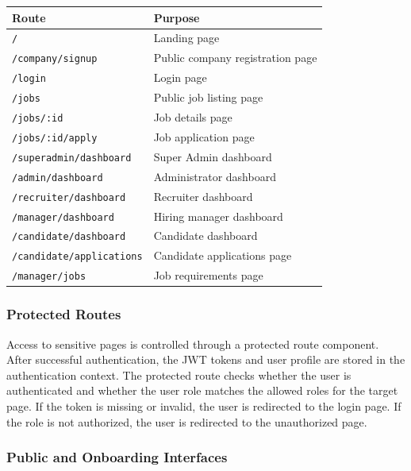 \begin{center}
\label{tab:frontend_routes}
\renewcommand{\arraystretch}{0.8}
\begin{tabularx}{\textwidth}{|l|l|}
\hline
\rowcolor{gray!20} \textbf{Route} & \textbf{Purpose} \\
\hline
\texttt{/} & Landing page \\
\hline
\texttt{/company/signup} & Public company registration page \\
\hline
\texttt{/login} & Login page \\
\hline
\texttt{/jobs} & Public job listing page \\
\hline
\texttt{/jobs/:id} & Job details page \\
\hline
\texttt{/jobs/:id/apply} & Job application page \\
\hline
\texttt{/superadmin/dashboard} & Super Admin dashboard \\
\hline
\texttt{/admin/dashboard} & Administrator dashboard \\
\hline
\texttt{/recruiter/dashboard} & Recruiter dashboard \\
\hline
\texttt{/manager/dashboard} & Hiring manager dashboard \\
\hline
\texttt{/candidate/dashboard} & Candidate dashboard \\
\hline
\texttt{/candidate/applications} & Candidate applications page \\
\hline
\texttt{/manager/jobs} & Job requirements page \\
\hline
\end{tabularx}
\end{center}

\subsubsection{Protected Routes}

Access to sensitive pages is controlled through a protected route component. After successful authentication, the JWT tokens and user profile are stored in the authentication context. The protected route checks whether the user is authenticated and whether the user role matches the allowed roles for the target page. If the token is missing or invalid, the user is redirected to the login page. If the role is not authorized, the user is redirected to the unauthorized page.

\subsubsection{Public and Onboarding Interfaces}

